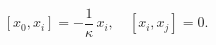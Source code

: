 \begin{equation}\label{5}
  [x_0, x_i] = -\frac{1}{\kappa}\, x_i, \quad [x_i, x_j] = 0.
\end{equation}

